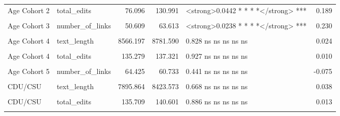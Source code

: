 \begin{table}
\begin{tabular}[t]{llrrlr}
\cmidrule{1-6}
Age Cohort 2 & total_edits & 76.096 & 130.991 & <strong>0.0442 * * * *</strong> *** & 0.189\\
\cmidrule{1-6}
\cellcolor{gray!10}{Age Cohort 3} & \cellcolor{gray!10}{text_length} & \cellcolor{gray!10}{7263.361} & \cellcolor{gray!10}{9320.414} & \cellcolor{gray!10}{0.136 ns ns ns ns ns} & \cellcolor{gray!10}{0.145}\\
\cmidrule{1-6}
Age Cohort 3 & number_of_links & 50.609 & 63.613 & <strong>0.0238 * * * *</strong> *** & 0.230\\
\cmidrule{1-6}
\cellcolor{gray!10}{Age Cohort 3} & \cellcolor{gray!10}{total_edits} & \cellcolor{gray!10}{136.039} & \cellcolor{gray!10}{161.231} & \cellcolor{gray!10}{0.488 ns ns ns ns ns} & \cellcolor{gray!10}{0.066}\\
\cmidrule{1-6}
Age Cohort 4 & text_length & 8566.197 & 8781.590 & 0.828 ns ns ns ns ns & 0.024\\
\cmidrule{1-6}
\cellcolor{gray!10}{Age Cohort 4} & \cellcolor{gray!10}{number_of_links} & \cellcolor{gray!10}{61.891} & \cellcolor{gray!10}{60.904} & \cellcolor{gray!10}{0.86 ns ns ns ns ns} & \cellcolor{gray!10}{-0.019}\\
\cmidrule{1-6}
Age Cohort 4 & total_edits & 135.279 & 137.321 & 0.927 ns ns ns ns ns & 0.010\\
\cmidrule{1-6}
\cellcolor{gray!10}{Age Cohort 5} & \cellcolor{gray!10}{text_length} & \cellcolor{gray!10}{8630.700} & \cellcolor{gray!10}{9036.357} & \cellcolor{gray!10}{0.692 ns ns ns ns ns} & \cellcolor{gray!10}{0.039}\\
\cmidrule{1-6}
Age Cohort 5 & number_of_links & 64.425 & 60.733 & 0.441 ns ns ns ns ns & -0.075\\
\cmidrule{1-6}
\cellcolor{gray!10}{Age Cohort 5} & \cellcolor{gray!10}{total_edits} & \cellcolor{gray!10}{139.010} & \cellcolor{gray!10}{129.938} & \cellcolor{gray!10}{0.76 ns ns ns ns ns} & \cellcolor{gray!10}{-0.030}\\
\cmidrule{1-6}
CDU/CSU & text_length & 7895.864 & 8423.573 & 0.668 ns ns ns ns ns & 0.038\\
\cmidrule{1-6}
\cellcolor{gray!10}{CDU/CSU} & \cellcolor{gray!10}{number_of_links} & \cellcolor{gray!10}{55.465} & \cellcolor{gray!10}{58.028} & \cellcolor{gray!10}{0.598 ns ns ns ns ns} & \cellcolor{gray!10}{0.047}\\
\cmidrule{1-6}
CDU/CSU & total_edits & 135.709 & 140.601 & 0.886 ns ns ns ns ns & 0.013\\
\cmidrule{1-6}
\cellcolor{gray!10}{AfD} & \cellcolor{gray!10}{text_length} & \cellcolor{gray!10}{18423.667} & \cellcolor{gray!10}{27125.083} & \cellcolor{gray!10}{0.566 ns ns ns ns ns} & \cellcolor{gray!10}{0.239}\\

\end{tabular}
\end{table}
